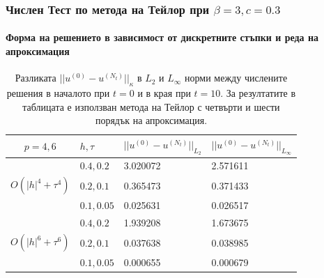 \documentclass{beamer}
\begin{document}
\begin{frame}
\frametitle{Числен Тест по метода на Тейлор при $\beta = 3, c=0.3$}
\framesubtitle{Форма на решението в зависимост от дискретните стъпки и реда на апроксимация}

\begin{table}[ht]
\centering
\small
		\begin{tabular}{||c|l|l|l||}
			\hline
			\hline
  $p=4,6$   &  $h, \tau$ &  $||u^{(0)} - u^{(N_t)}||_{L_2}$  & $||u^{(0)} - u^{(N_t)}||_{L_\infty}$   \\
   		      \hline 
			\hline
           				& $0.4, 0.2$   &  3.020072 & 2.571611     \\
			\hline 
  $O(|h|^4+\tau^4)$ & $0.2, 0.1$   & 0.365473 & 0.371433      \\
			\hline 
           				& $0.1, 0.05$ & 0.025631 & 0.026517      \\
	   \hline
          \hline
           				& $0.4, 0.2$   & 1.939208 & 1.673675      \\
			\hline
  $O(|h|^6+\tau^6)$ & $0.2, 0.1$   & 0.037638 & 0.038985      \\
    \hline
           				& $0.1, 0.05$  & 0.000655 & 0.000679       \\
	   \hline
		\hline 
		\end{tabular}
		\caption{Разликата $||u^{(0)} - u^{(N_t)}||_\kappa$ в $L_2$ и $L_\infty$ норми между числените решения в началото при $t=0$ и в края при $t=10$. За резултатите в таблицата е използван метода на Тейлор с четвърти и шести порядък на апроксимация. }
\label{tableK}
\end{table}

\end{frame}
\end{document}
